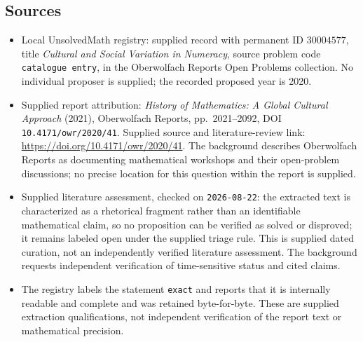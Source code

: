\documentclass[11pt]{article}
\begin{document}
\subsection{Sources}
\begin{itemize}
\item Local UnsolvedMath registry: supplied record with permanent ID \(30004577\), title \emph{Cultural and Social Variation in Numeracy}, source problem code \texttt{catalogue entry}, in the Oberwolfach Reports Open Problems collection. No individual proposer is supplied; the recorded proposed year is 2020.
\item Supplied report attribution: \emph{History of Mathematics: A Global Cultural Approach} (2021), Oberwolfach Reports, pp.\ 2021--2092, DOI \texttt{10.4171/owr/2020/41}. Supplied source and literature-review link: \url{https://doi.org/10.4171/owr/2020/41}. The background describes Oberwolfach Reports as documenting mathematical workshops and their open-problem discussions; no precise location for this question within the report is supplied.
\item Supplied literature assessment, checked on \texttt{2026-08-22}: the extracted text is characterized as a rhetorical fragment rather than an identifiable mathematical claim, so no proposition can be verified as solved or disproved; it remains labeled open under the supplied triage rule. This is supplied dated curation, not an independently verified literature assessment. The background requests independent verification of time-sensitive status and cited claims.
\item The registry labels the statement \texttt{exact} and reports that it is internally readable and complete and was retained byte-for-byte. These are supplied extraction qualifications, not independent verification of the report text or mathematical precision.
\end{itemize}
\end{document}
